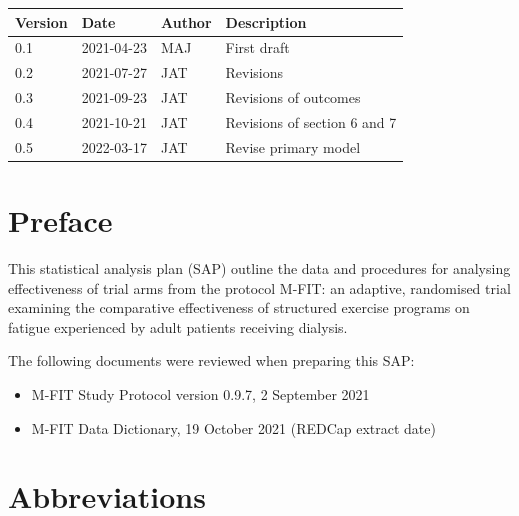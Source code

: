 \documentclass[11pt,parskip=half-]{scrartcl}
\renewcommand{\arraystretch}{0.5}
\providecommand{\tightlist}{%
  \setlength{\itemsep}{0pt}\setlength{\parskip}{0pt}}
\begin{document}
\begin{table}[H]
  \renewcommand{\arraystretch}{1}
  \begin{center}
    \begin{tabular}{lllp{5cm}}
      \hline
      Version & Date       & Author & Description                  \\ \hline
      0.1     & 2021-04-23 & MAJ    & First draft                  \\
      0.2     & 2021-07-27 & JAT    & Revisions                    \\
      0.3     & 2021-09-23 & JAT    & Revisions of outcomes        \\
      0.4     & 2021-10-21 & JAT    & Revisions of section 6 and 7 \\
      0.5     & 2022-03-17 & JAT    & Revise primary model         \\
      \hline
    \end{tabular}
  \end{center}
\end{table}

\clearpage

\section*{Preface}
\label{preface}

This statistical analysis plan (SAP) outline the data and procedures for analysing effectiveness of trial arms from the protocol M-FIT: an adaptive, randomised trial examining the comparative effectiveness of structured exercise programs on fatigue experienced by adult patients receiving dialysis.

The following documents were reviewed when preparing this SAP:

\begin{itemize}\tightlist
  \item M-FIT Study Protocol version 0.9.7, 2 September 2021
  \item M-FIT Data Dictionary, 19 October 2021 (REDCap extract date)
\end{itemize}

\clearpage

\section*{Abbreviations}
\label{abbreviations}
\end{document}
